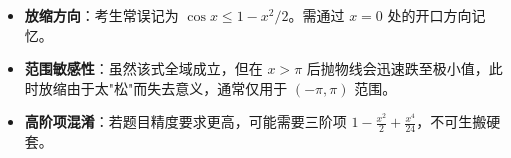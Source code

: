 \begin{trapbox}
\begin{itemize}
    \item \textbf{放缩方向}：考生常误记为 $\cos x \leqslant 1 - x^2/2$。需通过 $x=0$ 处的开口方向记忆。
    \item \textbf{范围敏感性}：虽然该式全域成立，但在 $x > \pi$ 后抛物线会迅速跌至极小值，此时放缩由于太"松"而失去意义，通常仅用于 $(-\pi, \pi)$ 范围。
    \item \textbf{高阶项混淆}：若题目精度要求更高，可能需要三阶项 $1 - \frac{x^2}{2} + \frac{x^4}{24}$，不可生搬硬套。
\end{itemize}
\end{trapbox}